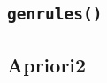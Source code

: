 %



\subsection{\texttt{genrules()}}
\label{sec:2-2-1-genrules}
%



\subsection{Apriori2}
\label{sec:2-2-2-Apriori2}
%




% 
